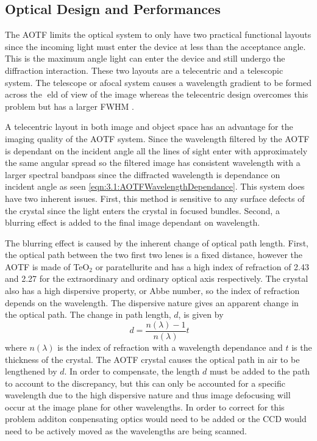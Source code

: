\documentclass[12pt]{article}
\begin{document}
\subsection{Optical Design and Performances}

The AOTF limits the optical system to only have two practical functional layouts since the incoming light must enter the device at less than the acceptance angle. This is the maximum angle light can enter the device and still undergo the diffraction interaction. These two layouts are a telecentric and a telescopic system. The telescope or afocal system causes a wavelength gradient to be formed across the eld of view of the image whereas the telecentric design overcomes this problem but has a larger FWHM \citep{Suhre2004}.

A telecentric layout in both image and object space has an advantage for the imaging quality of the AOTF system. Since the wavelength filtered by the AOTF is dependant on the incident angle all the lines of sight enter with approximately the same angular spread so the filtered image has consistent wavelength with a larger spectral bandpass since the diffracted wavelength is dependance on incident angle as seen \autoref{eqn:3.1:AOTFWavelengthDependance}. This system does have two inherent issues. First, this method is sensitive to any surface defects of the crystal since the light enters the crystal in focused bundles. Second, a blurring effect is added to the final image dependant on wavelength.

The blurring effect is caused by the inherent change of optical path length. First, the optical path between the two first two lenes is a fixed distance, however the AOTF is made of TeO$_{2}$  or paratellurite and has a high index of refraction of 2.43 and 2.27 for the extraordinary and ordinary optical axis respectively. The crystal also has a high dispersive property, or Abbe number, so the index of refraction depends on the wavelength. The dispersive nature gives an apparent change in the optical path. The change in path length, $d$, is given by
\begin{equation}
    \ d = \frac{n(\lambda)-1}{n(\lambda)}t
    \label{eqn:3.2:opticalPathDisplacement}
\end{equation}
where $n(\lambda)$ is the index of refraction with a wavelength dependance and $t$ is the thickness of the crystal. The AOTF crystal causes the optical path in air to be lengthened by $d$. In order to compensate, the length $d$ must be added to the path to account to the discrepancy, but this can only be accounted for a specific wavelength due to the high dispersive nature and thus image defocusing will occur at the image plane for other wavelengths. In order to correct for this problem additon conpensating optics would need to be added or the CCD would need to be actively moved as the wavelengths are being scanned.
\end{document}
